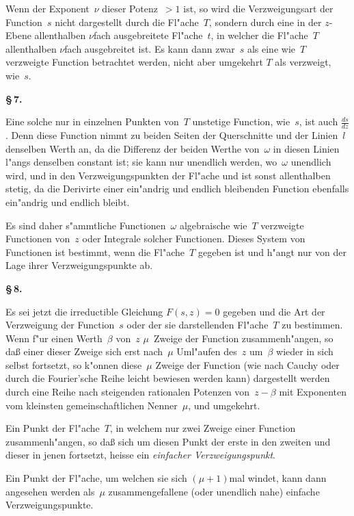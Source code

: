 \documentclass[12pt,a4paper]{article}
\begin{document}
Wenn der Exponent~$\nu$ dieser Potenz~$> 1$ ist, so wird die
Verzweigungsart der Function~$s$ nicht dargestellt durch die Fl"ache~$T$,
sondern durch eine in der $z$-Ebene allenthalben $\nu$fach ausgebreitete
Fl"ache~$t$, in welcher die Fl"ache~$T$ allenthalben $\nu$fach ausgebreitet ist.
Es kann dann zwar~$s$ als eine wie~$T$ verzweigte Function betrachtet
werden, nicht aber umgekehrt $T$ als verzweigt, wie~$s$.

\medskip
\textbf{\S\,7.}

Eine solche nur in einzelnen Punkten von~$T$ unstetige Function,
wie~$s$, ist auch $\displaystyle\frac{ds}{dz}$. Denn diese Function nimmt zu beiden
Seiten der Querschnitte und der Linien~$l$ denselben Werth an, da die
Differenz der beiden Werthe von~$\omega$ in diesen Linien l"angs denselben
constant ist; sie kann nur unendlich werden, wo~$\omega$ unendlich wird,
und in den Verzweigungspunkten der Fl"ache und ist sonst allenthalben
stetig, da die Derivirte einer ein"andrig und endlich bleibenden Function
ebenfalls ein"andrig und endlich bleibt.

Es sind daher s"ammtliche Functionen~$\omega$ algebraische wie~$T$
verzweigte Functionen von~$z$ oder Integrale solcher Functionen.
Dieses System von Functionen ist bestimmt, wenn die Fl"ache~$T$ gegeben
ist und h"angt nur von der Lage ihrer Verzweigungspunkte ab.

\medskip
\textbf{\S\,8.}

Es sei jetzt die irreductible Gleichung $F(s,z) = 0$ gegeben und die
Art der Verzweigung der Function~$s$ oder der sie darstellenden Fl"ache~$T$
zu bestimmen. Wenn f"ur einen Werth~$\beta$ von~$z$ $\mu$~Zweige der Function
zusammenh"angen, so da\ss{} einer dieser Zweige sich erst nach~$\mu$ Uml"aufen
des~$z$ um~$\beta$ wieder in sich selbst fortsetzt, so k"onnen diese~$\mu$ Zweige
der Function (wie nach Cauchy oder durch die Fourier'sche Reihe leicht
bewiesen werden kann) dargestellt werden durch eine Reihe nach steigenden
rationalen Potenzen von~$z - \beta$ mit Exponenten vom kleinsten
gemeinschaftlichen Nenner~$\mu$, und umgekehrt.

Ein Punkt der Fl"ache~$T$, in welchem nur zwei Zweige einer Function
zusammenh"angen, so da\ss{} sich um diesen Punkt der erste in den zweiten
und dieser in jenen fortsetzt, heisse ein \emph{einfacher Verzweigungspunkt}.

Ein Punkt der Fl"ache, um welchen sie sich $(\mu+1)$mal windet,
kann dann angesehen werden als~$\mu$ zusammengefallene (oder unendlich
nahe) einfache Verzweigungspunkte.
\end{document}
